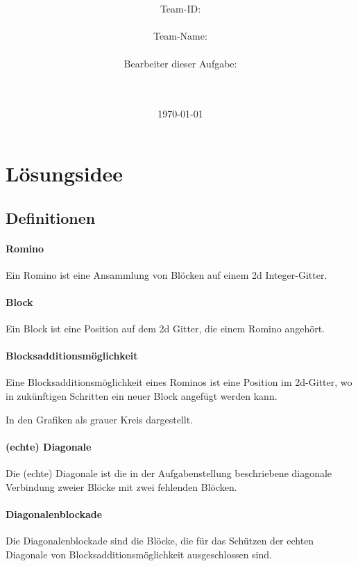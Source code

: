 \documentclass[a4paper,10pt,ngerman]{scrartcl}
\title{\textbf{\Huge\Aufgabe}}
\author{\LARGE Team-ID: \LARGE \TeamID \\\\
        \LARGE Team-Name: \LARGE \TeamName \\\\
        \LARGE Bearbeiter dieser Aufgabe: \\ 
        \LARGE \Namen\\\\}
\date{\LARGE\today}
\begin{document}
\maketitle
\tableofcontents


\section{Lösungsidee}

\subsection{Definitionen}

\paragraph{Romino}

Ein Romino ist eine Ansammlung von Blöcken auf einem 2d Integer-Gitter.

\paragraph{Block}

Ein Block ist eine Position auf dem 2d Gitter, die einem Romino angehört.

\paragraph{Blocksadditionsmöglichkeit}

Eine Blocksadditionsmöglichkeit eines Rominos ist eine Position im 2d-Gitter, wo in zukünftigen Schritten ein neuer Block angefügt werden kann.

In den Grafiken als grauer Kreis dargestellt.

\paragraph{(echte) Diagonale}

Die (echte) Diagonale ist die in der Aufgabenstellung beschriebene diagonale Verbindung zweier Blöcke mit zwei fehlenden Blöcken.

\paragraph{Diagonalenblockade}

Die Diagonalenblockade sind die Blöcke, die für das Schützen der echten Diagonale von Blocksadditionsmöglichkeit ausgeschlossen sind.
\end{document}
